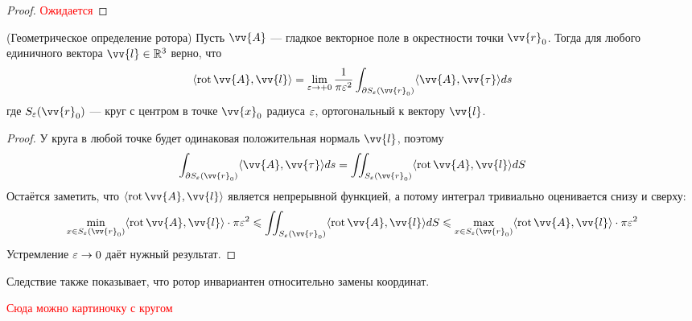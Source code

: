\begin{proof}
	\textcolor{red}{Ожидается}
\end{proof}

\begin{corollary} (Геометрическое определение ротора)
	Пусть $\vv{A}$ --- гладкое векторное поле в окрестности точки $\vv{r}_0$. Тогда для любого единичного вектора $\vv{l} \in \R^3$ верно, что
	\[
	\ntbr{\rot \vv{A}, \vv{l}} = \lim_{\eps \to +0} \frac{1}{\pi \eps^2} \int_{\vdelta S_\eps(\vv{r}_0)} \ntbr{\vv{A}, \vv{\tau}}ds
	\]
	где $S_\eps(\vv{r}_0)$ --- круг с центром в точке $\vv{x}_0$ радиуса $\varepsilon$, ортогональный к вектору $\vv{l}$.
\end{corollary}

\begin{proof}
	У круга в любой точке будет одинаковая положительная нормаль $\vv{l}$, поэтому
	\[
	\int_{\vdelta S_\eps(\vv{r}_0)} \ntbr{\vv{A}, \vv{\tau}}ds = \iint_{S_\eps(\vv{r}_0)} \ntbr{\rot \vv{A}, \vv{l}}dS
	\]
	Остаётся заметить, что $\ntbr{\rot \vv{A}, \vv{l}}$ является непрерывной функцией, а потому интеграл тривиально оценивается снизу и сверху:
	\[
	\min_{x \in S_\eps(\vv{r}_0)} \ntbr{\rot \vv{A}, \vv{l}} \cdot \pi\eps^2 \le \iint_{S_\eps(\vv{r}_0)} \ntbr{\rot \vv{A}, \vv{l}}dS \le \max_{x \in S_\eps(\vv{r}_0)} \ntbr{\rot \vv{A}, \vv{l}} \cdot \pi\eps^2
	\]
	Устремление $\varepsilon \to 0$ даёт нужный результат.
\end{proof}

\begin{note}
	Следствие также показывает, что ротор инвариантен относительно замены координат.
\end{note}

\textcolor{red}{Сюда можно картиночку с кругом}
